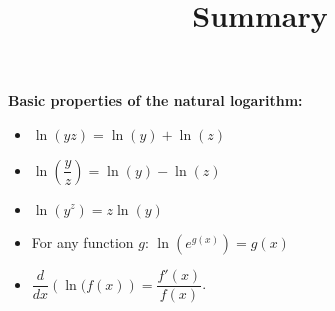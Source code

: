\documentclass{ximera}
\title[Summary]{Summary}
\begin{document}
\begin{abstract} \end{abstract}
\maketitle



\textbf{Basic properties of the natural logarithm:}
\begin{itemize}
	\item $\displaystyle \ln\left( yz \right) = \ln(y) + \ln(z)$
	\item $\displaystyle \ln\left( \dfrac{y}{z} \right) = \ln(y) - \ln(z)$
	\item $\displaystyle \ln\left( y^z \right) = z\ln(y)$
   	 \item For any function $g$: $\displaystyle \ln( e^{g(x)} ) = g(x)$
	\item $\displaystyle \dfrac{d}{dx} \left( \ln(f(x) \right) = \dfrac{f'(x)}{f(x)}$.
\end{itemize}
\end{document}
